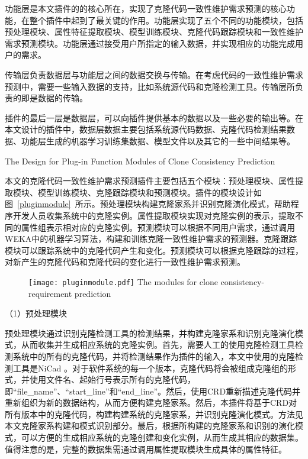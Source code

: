 功能层是本文插件的的核心所在，实现了克隆代码一致性维护需求预测的核心功能，在整个插件中起到了最关键的作用。功能层实现了五个不同的功能模块，包括预处理模块、属性特征提取模块、模型训练模块、克隆代码跟踪模块和一致性维护需求预测模块。功能层通过接受用户所指定的输入数据，并实现相应的功能完成用户的需求。

传输层负责数据层与功能层之间的数据交换与传输。在考虑代码的一致性维护需求预测中，需要一些输入数据的支持，比如系统源代码和克隆检测工具。传输层所负责的即是数据的传输。

插件的最后一层是数据层，可以向插件提供基本的数据以及一些必要的输出等。在本文设计的插件中，数据层数据主要包括系统源代码数据、克隆代码检测结果数据、功能层生成的机器学习训练集数据、模型文件以及其它的一些中间结果等。

{The Design for Plug-in Function Modules of Clone Consistency Prediction}

本文的克隆代码一致性维护需求预测插件主要包括五个模块：预处理模块、属性提取模块、模型训练模块、克隆跟踪模块和预测模块。插件的模块设计如图~\ref{pluginmodule}~所示。预处理模块构建克隆家系并识别克隆演化模式，帮助程序开发人员收集系统中的克隆实例。属性提取模块实现对克隆实例的表示，提取不同的属性组表示相对应的克隆实例。预测模块可以根据不同用户需求，通过调用WEKA中的机器学习算法，构建和训练克隆一致性维护需求的预测器。克隆跟踪模块可以跟踪系统中的克隆代码产生和变化。预测模块可以根据克隆跟踪的过程，对新产生的克隆代码和克隆代码的变化进行一致性维护需求预测。

\begin{figure}[h]
\centering
\texttt{[image: pluginmodule.pdf]}
{The modules for clone consistency-requirement prediction}
\vspace{-1em}
\end{figure}

（1）预处理模块

预处理模块通过识别克隆检测工具的检测结果，并构建克隆家系和识别克隆演化模式，从而收集并生成相应系统的克隆实例。首先，需要人工的使用克隆检测工具检测系统中的所有的克隆代码，并将检测结果作为插件的输入，本文中使用的克隆检测工具是NiCad 。对于软件系统的每一个版本，克隆代码将会被组成克隆组的形式，并使用文件名、起始行号表示所有的克隆代码，即“{file\_name}”、“{start\_line}”和“{end\_line}”。然后，使用CRD重新描述克隆代码并重新组织为新的数据结构，从而方便构建克隆家系。然后，本插件将基于CRD对所有版本中的克隆代码，构建构建系统的克隆家系，并识别克隆演化模式。方法见本文克隆家系构建和模式识别部分。最后，根据所构建的克隆家系和识别的演化模式，可以方便的生成相应系统的克隆创建和变化实例，从而生成其相应的数据集。值得注意的是，完整的数据集需通过调用属性提取模块生成具体的属性特征。

